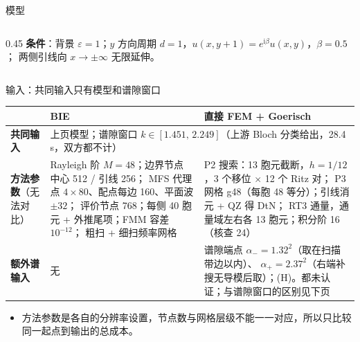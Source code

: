 \documentclass[aspectratio=169,11pt,fontset=fandol]{ctexbeamer}
\begin{document}
\begin{frame}{模型}
\begin{columns}[T]
\begin{column}{0.45\textwidth}
      \vspace{0.4em}
      \textbf{条件}：背景 $\varepsilon=1$；$y$ 方向周期 $d=1$，$u(x,y+1)=e^{\mathrm i\beta}u(x,y)$，$\beta=0.5$；
      两侧引线向 $x\to\pm\infty$ 无限延伸。
    \end{column}
  \end{columns}
\end{frame}

\begin{frame}{输入：共同输入只有模型和谱隙窗口}
  \centering\scriptsize
  \begin{tabular}{p{}p{}p{}}
    \toprule
    & BIE & 直接 FEM + Goerisch \\
    \midrule
    \textbf{共同输入} & \multicolumn{2}{p{0.78\textwidth}}{上页模型；谱隙窗口 $k\in[1.451,\,2.249]$（上游 Bloch 分类给出，28.4\,s，双方都不计）} \\
    \addlinespace
    \textbf{方法参数}（无法对比） &
      Rayleigh 阶 $M=48$；边界节点 中心 512 / 引线 256；
      MFS 代理点 $4\times80$、配点每边 160、平面波 $\pm32$；
      评价节点 768；每侧 40 胞元 + 外推尾项；FMM 容差 $10^{-12}$；
      粗扫 + 细扫频率网格 &
      P2 搜索：13 胞元截断，$h=1/12$，3 个移位 $\times$ 12 个 Ritz 对；
      P3 网格 g48（每胞 48 等分）；引线消元 + QZ 得 DtN；
      RT3 通量，通量域左右各 13 胞元；积分阶 16（核查 24） \\
    \addlinespace
    \textbf{额外谱输入} & 无 &
      \alert{谱隙端点} $\alpha_-=1.32^2$（取在扫描带边以内）、
      $\alpha_+=2.37^2$（右端补搜无导模后取）；\alert{(H)}。都未认证；与谱隙窗口的区别见下页 \\
    \bottomrule
  \end{tabular}
  \raggedright\vspace{0.3em}
  \begin{itemize}\small
    \item 方法参数是各自的分辨率设置，节点数与网格层级不能一一对应，所以只比较\alert{同一起点到输出}的总成本。
  \end{itemize}
\end{frame}
\end{document}
